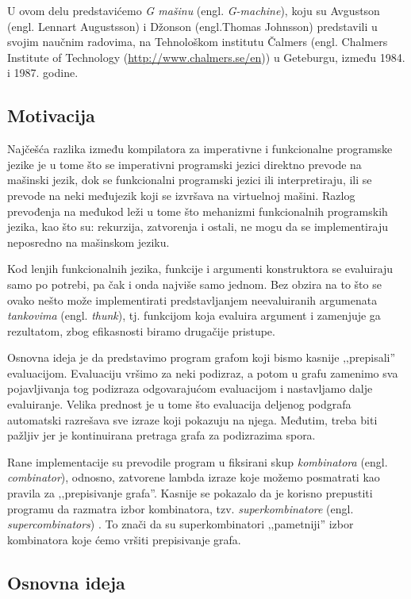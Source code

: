\documentclass[a4paper]{article}
\begin{document}
U ovom delu predstavićemo {\em G mašinu} (engl. \textit{G-machine}), koju su Avgustson (engl. Lennart Augustsson) i Džonson (engl.Thomas Johnsson) predstavili u svojim naučnim radovima, na Tehnološkom institutu Čalmers (engl. Chalmers Institute of Technology (\url{http://www.chalmers.se/en})) u Geteburgu, između 1984. i 1987. godine. 

\subsection{Motivacija}

Najčešća razlika između kompilatora za imperativne i funkcionalne programske jezike je u tome što se imperativni programski jezici direktno prevode na mašinski jezik, dok se funkcionalni programski jezici ili interpretiraju, ili se prevode na neki međujezik koji se izvršava na virtuelnoj mašini. Razlog prevođenja na međukod leži u tome što mehanizmi funkcionalnih programskih jezika, kao što su: rekurzija, zatvorenja i ostali, ne mogu da se implementiraju neposredno na mašinskom jeziku.

Kod lenjih funkcionalnih jezika, funkcije i argumenti konstruktora se evaluiraju samo po potrebi, pa čak i onda najviše samo jednom. Bez obzira na to što se ovako nešto može implementirati predstavljanjem neevaluiranih argumenata \textit{tankovima} (engl. \textit{thunk}), tj. funkcijom koja evaluira argument i zamenjuje ga rezultatom, zbog efikasnosti biramo drugačije pristupe.

Osnovna ideja je da predstavimo program grafom koji bismo kasnije ‚‚prepisali''  evaluacijom. Evaluaciju vršimo za neki podizraz, a potom u grafu zamenimo sva pojavljivanja tog podizraza odgovarajućom evaluacijom i nastavljamo dalje evaluiranje. Velika prednost je u tome što evaluacija deljenog podgrafa automatski razrešava sve izraze koji pokazuju na njega. Međutim, treba biti pažljiv jer je kontinuirana pretraga grafa za podizrazima spora.

Rane implementacije su prevodile program u fiksirani skup \textit{kombinatora} (engl. \textit{combinator}), odnosno, zatvorene lambda izraze koje možemo posmatrati kao pravila za ‚‚prepisivanje grafa''. Kasnije se pokazalo da je korisno prepustiti programu da razmatra izbor kombinatora, tzv. {\em superkombinatore} (engl. \textit{supercombinators}) \cite{super-combinators}. To znači da su superkombinatori ‚‚pametniji'' izbor kombinatora koje ćemo vršiti prepisivanje grafa. 

\subsection{Osnovna ideja} 
\end{document}
